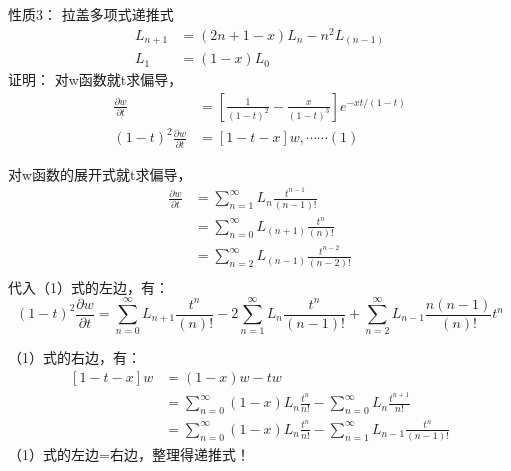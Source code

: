 \begin{frame}
	\alert{	性质3：}  拉盖多项式递推式
	\begin{equation*}
	\begin{split}
		L_{n+1} &= (2n+1-x) L_n  -n^2 L_(n-1)  \\
		L_1 &=(1-x) L_0 
	\end{split}		
	\end{equation*}	
	\alert{	证明：}  对w函数就t求偏导， 
	\begin{equation*}
	\begin{split}
		\frac{\partial w}{\partial t}  &= [\frac{1}{(1-t)^2} -\frac{x}{(1-t)^3}]  e^{-xt/(1-t) }     \\
		(1-t)^2	\frac{\partial w}{\partial t}  &= [1 -t-x] w   , \cdots \cdots  (1)
	\end{split}		
	\end{equation*}	
\end{frame}		

\begin{frame}
	对w函数的展开式就t求偏导， 
	\begin{equation*}
	\begin{split}
		\frac{\partial w}{\partial t}  &=   \sum_{n=1}^{\infty}  L_n  \frac{t^{n-1}}{(n-1)!}   \\
		&=  \sum_{n=0}^{\infty}  L_(n+1)  \frac{t^n}{(n)!} \\
		&=  \sum_{n=2}^{\infty}  L_(n-1)  \frac{t^{n-2}}{(n-2)!} \\
	\end{split}		
	\end{equation*}	
	代入（1）式的左边，有：
	\begin{equation*}
		(1-t)^2	\frac{\partial w}{\partial t}  =   \sum_{n=0}^{\infty}  L_{n+1}  \frac{t^n}{(n)!}  -2  \sum_{n=1}^{\infty}  L_{n}  \frac{t^n}{(n-1)!} +  \sum_{n=2}^{\infty}  L_{n-1}  \frac{n(n-1)}{(n)!}  t^n
	\end{equation*}	
\end{frame}		

\begin{frame}
	（1）式的右边，有：
	\begin{equation*}
		\begin{split}
			[1 -t-x] w &= (1-x)w -t w \\
			& =   \sum_{n=0}^{\infty} (1-x) L_n  \frac{t^n}{n!} -  \sum_{n=0}^{\infty}  L_n  \frac{t^{n+1}}{n!} \\
			&=  \sum_{n=0}^{\infty} (1-x) L_n  \frac{t^n}{n!} -  \sum_{n=1}^{\infty}  L_{n-1}  \frac{t^n}{(n-1)!}
		\end{split}		
	\end{equation*}	
	（1）式的左边=右边，整理得递推式！
\end{frame}		

